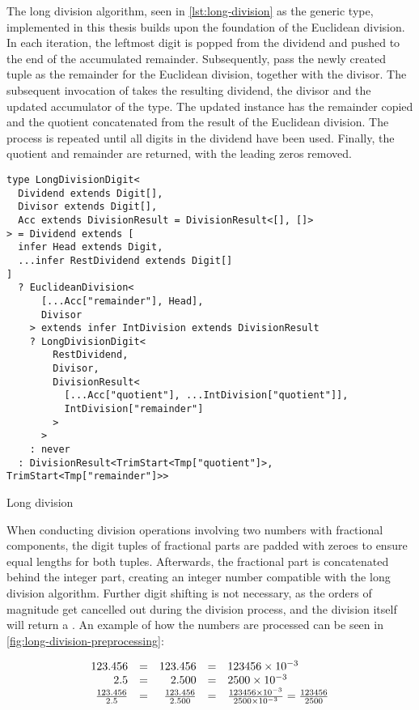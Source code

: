 The long division algorithm, seen in \ref{lst:long-division} as the  generic type, implemented in this thesis builds upon the foundation of the Euclidean division. In each iteration, the leftmost digit is popped from the dividend and pushed to the end of the accumulated remainder. Subsequently, pass the newly created tuple as the remainder for the Euclidean division, together with the divisor. The subsequent invocation of  takes the resulting dividend, the divisor and the updated accumulator of the  type. The updated  instance has the remainder copied and the quotient concatenated from the result of the Euclidean division. The process is repeated until all digits in the dividend have been used. Finally, the quotient and remainder are returned, with the leading zeros removed.

\begin{listing}[ht]
  \begin{verbatim}
type LongDivisionDigit<
  Dividend extends Digit[],
  Divisor extends Digit[],
  Acc extends DivisionResult = DivisionResult<[], []>
> = Dividend extends [
  infer Head extends Digit,
  ...infer RestDividend extends Digit[]
]
  ? EuclideanDivision<
      [...Acc["remainder"], Head],
      Divisor
    > extends infer IntDivision extends DivisionResult
    ? LongDivisionDigit<
        RestDividend,
        Divisor,
        DivisionResult<
          [...Acc["quotient"], ...IntDivision["quotient"]],
          IntDivision["remainder"]
        >
      >
    : never
  : DivisionResult<TrimStart<Tmp["quotient"]>, TrimStart<Tmp["remainder"]>>
\end{verbatim}
  \caption{Long division}\label{lst:long-division}
\end{listing}

When conducting division operations involving two numbers with fractional components, the digit tuples of fractional parts are padded with zeroes to ensure equal lengths for both tuples. Afterwards, the fractional part is concatenated behind the integer part, creating an integer number compatible with the long division algorithm. Further digit shifting is not necessary, as the orders of magnitude get cancelled out during the division process, and the division itself will return a . An example of how the numbers are processed can be seen in \ref{fig:long-division-preprocessing}:

\begin{equation}\label{fig:long-division-preprocessing}
  \begin{array}{r@{\quad=\quad}r@{\quad=\quad}l}
    123.456             & 123.456               & 123456 \times 10^{-3}                                                   \\
    2.5                 & 2.500                 & 2500 \times 10^{-3}                                                     \\
    \frac{123.456}{2.5} & \frac{123.456}{2.500} & \frac{123456 \times 10^{-3}}{2500 \times 10^{-3}} = \frac{123456}{2500}
  \end{array}
\end{equation}

